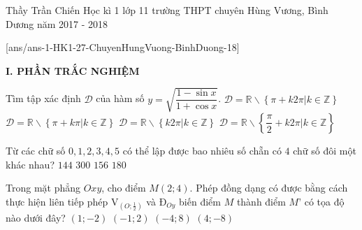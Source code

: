 	\begin{name}
		{Thầy Trần Chiến}
		{Học kì 1 lớp 11 trường THPT chuyên Hùng Vương, Bình Dương năm 2017 - 2018}
	\end{name}
	\setcounter{ex}{0}\setcounter{bt}{0}
	[ans/ans-1-HK1-27-ChuyenHungVuong-BinhDuong-18]
	
\noindent\textbf{I. PHẦN TRẮC NGHIỆM}

\begin{ex} %
Tìm tập xác định $\mathscr{D}$ của hàm số $y = \sqrt {\dfrac{1 - \sin x}{1 + \cos x}}$.
\choice
{\True $\mathscr{D}= \mathbb{R}\backslash \left\{ {\pi  + k2\pi |k \in \mathbb{Z}} \right\}$}
{$\mathscr{D} = \mathbb{R}\backslash \left\{ {\pi  + k\pi |k \in \mathbb{Z}} \right\}$}
{$\mathscr{D} = \mathbb{R}\backslash \left\{ {k2\pi |k \in \mathbb{Z}} \right\}$}
{$\mathscr{D} = \mathbb{R}\backslash \left\{ {\dfrac{\pi }{2} + k2\pi |k \in \mathbb{Z}} \right\}$}
\end{ex}

\begin{ex}%
Từ các chữ số $0, 1, 2, 3, 4, 5$ có thể lập được  bao nhiêu số chẵn có $4$ chữ số đôi một khác nhau?
\choice
{$144$}
{$300$}
{\True $156$}
{$180$}
\end{ex}

\begin{ex}%
Trong mặt phẳng $ Oxy $, cho điểm $M\left(2;4\right)$. Phép đồng dạng có được bằng cách thực hiện liên tiếp phép $\text{V}_{\left( O;\frac{1}{2} \right)}$  và $\text{Đ}_{Oy}$ biến điểm $M$ thành điểm $M’$ có tọa độ nào dưới đây?
\choice
{$\left(1; - 2\right)$}
{\True $\left(-1;  2\right)$}
{$\left(- 4;8\right)$}
{$\left(4; - 8\right)$}
\end{ex}

